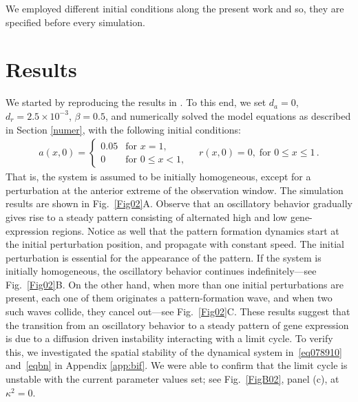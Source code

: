 \documentclass[11pt]{article}
\begin{document}
	We employed different initial conditions along the present work and so, they are specified before every simulation.

	\section{Results}
	\label{res}
	
	We started by reproducing the results in \citep{Cotterell2015}. To this end, we
	set $d_a=0$, $d_r = 2.5\times10^{-3}$, $\beta = 0.5$, and numerically solved the
	model equations as described in Section \ref{numer}, with the following initial 
	conditions:
	\begin{gather}
	a(x, 0) = \left\{\begin{array}{cl}
	0.05 & \text{for } x = 1, \\
	0 & \text{for } 0 \leq x < 1,
	\end{array} \right. 
	\quad
	r(x, 0) = 0, \; \text{for } 0 \leq x \leq 1\,.
	\end{gather}
	That is, the system is assumed to be initially homogeneous, except for a
	perturbation at the anterior extreme of the observation window.	
	The simulation results are
	shown in Fig.~\ref{Fig02}A. Observe that an oscillatory behavior
	gradually gives rise to a steady pattern consisting of alternated high and low
	gene-expression regions. Notice as well that the pattern formation dynamics start at
	the initial perturbation position, and propagate with constant speed. The
	initial perturbation is essential for the appearance of the pattern. If the
	system is initially homogeneous, the oscillatory behavior continues
	indefinitely---see Fig.~\ref{Fig02}B. On the other hand, when more than one
	initial perturbations are present, each one of them originates a
	pattern-formation wave, and when two such waves collide, they cancel out---see 
	Fig.~\ref{Fig02}C. These results suggest that the transition from an
	oscillatory behavior to a steady pattern of gene expression is due to a
	diffusion driven instability interacting with a limit cycle. To verify this,
	we investigated the spatial stability of the dynamical system
	in~\eqref{eq078910} and~\eqref{eqbn} in
	Appendix \ref{app:bif}. We were able to confirm
	that the limit cycle is unstable with the current parameter values set; see
	Fig.~\ref{FigB02}, panel (c), at $\kappa^2=0$.
	
\end{document}
